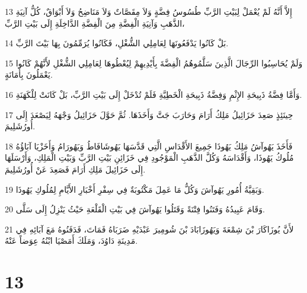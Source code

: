 \par 13 إِلاَّ أَنَّهُ لَمْ يُعْمَلْ لِبَيْتِ الرَّبِّ طُسُوسُ فِضَّةٍ وَلاَ مِقَصَّاتٌ وَلاَ مَنَاضِحُ وَلاَ أَبْوَاقٌ، كُلُّ آنِيَةِ الذَّهَبِ وَآنِيَةِ الْفِضَّةِ مِنَ الْفِضَّةِ الدَّاخِلَةِ إِلَى بَيْتِ الرَّبِّ،
\par 14 بَلْ كَانُوا يَدْفَعُونَهَا لِعَامِلِي الشُّغْلِ، فَكَانُوا يُرَمِّمُونَ بِهَا بَيْتَ الرَّبِّ.
\par 15 وَلَمْ يُحَاسِبُوا الرِّجَالَ الَّذِينَ سَلَّمُوهُمُ الْفِضَّةَ بِأَيْدِيهِمْ لِيُعْطُوهَا لِعَامِلِي الشُّغْلِ لأَنَّهُمْ كَانُوا يَعْمَلُونَ بِأَمَانَةٍ.
\par 16 وَأَمَّا فِضَّةُ ذَبِيحَةِ الإِثْمِ وَفِضَّةُ ذَبِيحَةِ الْخَطِيَّةِ فَلَمْ تُدْخَلْ إِلَى بَيْتِ الرَّبِّ، بَلْ كَانَتْ لِلْكَهَنَةِ.
\par 17 حِينَئِذٍ صَعِدَ حَزَائِيلُ مَلِكُ أَرَامَ وَحَارَبَ جَتَّ وَأَخَذَهَا. ثُمَّ حَوَّلَ حَزَائِيلُ وَجْهَهُ لِيَصْعَدَ إِلَى أُورُشَلِيمَ.
\par 18 فَأَخَذَ يَهُوآشُ مَلِكُ يَهُوذَا جَمِيعَ الأَقْدَاسِ الَّتِي قَدَّسَهَا يَهُوشَافَاطُ وَيَهُورَامُ وَأَخَزْيَا آبَاؤُهُ مُلُوكُ يَهُوذَا، وَأَقْدَاسَهُ وَكُلَّ الذَّهَبِ الْمَوْجُودِ فِي خَزَائِنِ بَيْتِ الرَّبِّ وَبَيْتِ الْمَلِكِ، وَأَرْسَلَهَا إِلَى حَزَائِيلَ مَلِكِ أَرَامَ فَصَعِدَ عَنْ أُورُشَلِيمَ.
\par 19 وَبَقِيَّةُ أُمُورِ يَهُوآشَ وَكُلُّ مَا عَمِلَ مَكْتُوبَةٌ فِي سِفْرِ أَخْبَارِ الأَيَّامِ لِمُلُوكِ يَهُوذَا.
\par 20 وَقَامَ عَبِيدُهُ وَفَتَنُوا فِتْنَةً وَقَتَلُوا يَهُوآشَ فِي بَيْتِ الْقَلْعَةِ حَيْثُ يَنْزِلُ إِلَى سَلَّى.
\par 21 لأَنَّ يُوزَاكَارَ بْنَ شِمْعَةَ وَيَهُوزَابَادَ بْنَ شُومِيرَ عَبْدَيْهِ ضَرَبَاهُ فَمَاتَ، فَدَفَنُوهُ مَعَ آبَائِهِ فِي مَدِينَةِ دَاوُدَ، وَمَلَكَ أَمَصْيَا ابْنُهُ عِوَضاً عَنْهُ.

\chapter{13}

